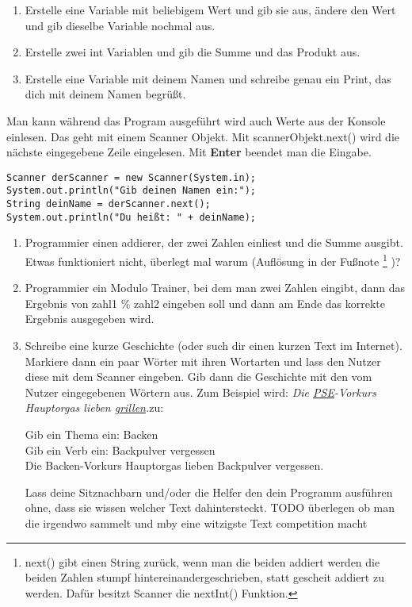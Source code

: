 \documentclass{../../sheet}
\begin{document}
\begin{enumerate}
\begin{ausgabe}
....................@@@@@@@@@@\#................@@@:..........................
.....................@@@@@@@@...................@@@..........................
.............................................................................
    \end{ausgabe}
    \item Erstelle eine Variable mit beliebigem Wert und gib sie aus, ändere den Wert und gib dieselbe Variable nochmal aus.
    \item Erstelle zwei int Variablen und gib die Summe und das Produkt aus.
    \item Erstelle eine Variable mit deinem Namen und schreibe genau ein Print, das dich mit deinem Namen begrüßt.
\end{enumerate}

\newpage
{}
Man kann während das Program ausgeführt wird auch Werte aus der Konsole einlesen. Das geht mit einem Scanner Objekt. Mit scannerObjekt.next() wird die nächste eingegebene Zeile eingelesen. Mit \textbf{Enter} beendet man die Eingabe.  
\begin{verbatim}
Scanner derScanner = new Scanner(System.in);
System.out.println("Gib deinen Namen ein:");
String deinName = derScanner.next();
System.out.println("Du heißt: " + deinName);
\end{verbatim}

\begin{enumerate}
    \item Programmier einen addierer, der zwei Zahlen einliest und die Summe ausgibt. Etwas funktioniert nicht, überlegt mal warum (Auflösung in der Fußnote
    \footnote{
        next() gibt einen String zurück, wenn man die beiden addiert werden die beiden Zahlen stumpf hintereinandergeschrieben, statt gescheit addiert zu werden. Dafür besitzt Scanner die nextInt() Funktion.
    }
    )?
    \item Programmier ein Modulo Trainer, bei dem man zwei Zahlen eingibt, dann das Ergebnis von zahl1 \% zahl2 eingeben soll und dann am Ende das korrekte Ergebnis ausgegeben wird.
    \item Schreibe eine kurze Geschichte (oder such dir einen kurzen Text im Internet). Markiere dann ein paar Wörter mit ihren Wortarten und lass den Nutzer diese mit dem Scanner eingeben. Gib dann die Geschichte mit den vom Nutzer eingegebenen Wörtern aus. Zum Beispiel wird: \textquotesingle\textquotesingle\textit{Die \underline{PSE}-Vorkurs Hauptorgas lieben \underline{grillen}.}\textquotesingle\textquotesingle \space zu:
    \begin{ausgabe}
Gib ein Thema ein: Backen\\
Gib ein Verb ein: Backpulver vergessen\\
Die Backen-Vorkurs Hauptorgas lieben Backpulver vergessen.
    \end{ausgabe}
    Lass deine Sitznachbarn und/oder die Helfer den dein Programm ausführen ohne, dass sie wissen welcher Text dahintersteckt. TODO überlegen ob man die irgendwo sammelt und mby eine witzigste Text competition macht
\end{enumerate}
\end{document}
